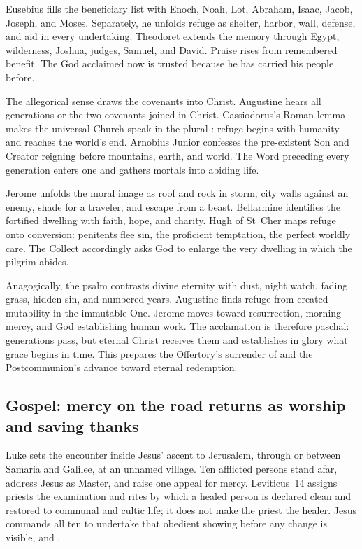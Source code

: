 Eusebius fills the beneficiary list with Enoch, Noah, Lot, Abraham, Isaac,
Jacob, Joseph, and Moses. Separately, he unfolds refuge as shelter, harbor,
wall, defense, and aid in every undertaking. Theodoret extends the memory through
Egypt, wilderness, Joshua, judges, Samuel, and David. Praise rises from
remembered benefit. The God acclaimed now is trusted because he has carried
his people before.

The allegorical sense draws the covenants into Christ. Augustine hears all
generations or the two covenants joined in Christ. Cassiodorus's Roman lemma
makes the universal Church speak in the plural : refuge begins
with humanity and reaches the world's end. Arnobius Junior confesses the
pre-existent Son and Creator reigning before mountains, earth, and world. The Word preceding every generation
enters one and gathers mortals into abiding life.

Jerome unfolds the moral image as roof and rock in storm, city walls against an
enemy, shade for a traveler, and escape from a beast. Bellarmine identifies the
fortified dwelling with faith, hope, and charity. Hugh of St~Cher maps refuge
onto conversion: penitents flee sin, the proficient temptation, the perfect
worldly care. The Collect accordingly asks God to enlarge the very dwelling in
which the pilgrim abides.

Anagogically, the psalm contrasts divine eternity with dust, night watch,
fading grass, hidden sin, and numbered years. Augustine finds refuge from
created mutability in the immutable One. Jerome moves toward resurrection,
morning mercy, and God establishing human work. The acclamation is therefore
paschal: generations pass, but eternal Christ receives them and establishes in
glory what grace begins in time. This prepares the Offertory's surrender of
 and the Postcommunion's advance toward eternal redemption.

\subsection*{Gospel: mercy on the road returns as worship and saving thanks\enspace{}}

Luke sets the encounter inside Jesus' ascent to Jerusalem, through or between
Samaria and Galilee, at an unnamed village. Ten afflicted persons stand afar,
address Jesus as Master, and raise one appeal for mercy. Leviticus~14 assigns
priests the examination and rites by which a healed person is declared clean
and restored to communal and cultic life; it does not make the priest the
healer. Jesus commands all ten to undertake that obedient showing before any
change is visible, and .

